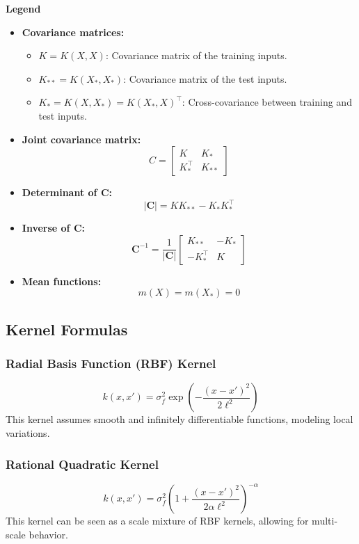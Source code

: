 \documentclass{ucdgradtaughtthesis}
\begin{document}
\noindent
\textbf{Legend}
\begin{itemize}
    \item \textbf{Covariance matrices:}
    \begin{itemize}
        \item \( K = K(X, X) \): Covariance matrix of the training inputs.
        \item \( K_{**} = K(X_*, X_*) \): Covariance matrix of the test inputs.
        \item \( K_* = K(X, X_*) = K(X_*, X)^\top \): Cross-covariance between training and test inputs.
    \end{itemize}
    
    \item \textbf{Joint covariance matrix:}
    \[
    C = \begin{bmatrix}
    K & K_* \\
    K_*^\top & K_{**}
    \end{bmatrix}
    \]
    
    \item \textbf{Determinant of \( \mathbf{C} \):}
    \[
    |\mathbf{C}| = K K_{**} - K_* K_*^\top
    \]
    
    \item \textbf{Inverse of \( \mathbf{C} \):}
    \[
    \mathbf{C}^{-1} = \frac{1}{|\mathbf{C}|}
    \begin{bmatrix}
    K_{**} & -K_* \\
    -K_*^\top & K
    \end{bmatrix}
    \]
    
    \item \textbf{Mean functions:}
    \[
    m(X) = m(X_*) = 0
    \]
\end{itemize}



\subsection{Kernel Formulas}
\label{appendix:B}
\subsubsection*{Radial Basis Function (RBF) Kernel}
\[
k(x, x') = \sigma_f^2 \exp\left( -\frac{(x - x')^2}{2\ell^2} \right)
\]
This kernel assumes smooth and infinitely differentiable functions, modeling local variations.


\subsubsection*{Rational Quadratic Kernel}
\[
k(x, x') = \sigma_f^2 \left( 1 + \frac{(x - x')^2}{2 \alpha \ell^2} \right)^{-\alpha}
\]
This kernel can be seen as a scale mixture of RBF kernels, allowing for multi-scale behavior.
\end{document}
